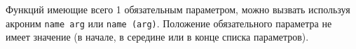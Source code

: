 \begin{sourcecode}
	\label{defaultparametrs}
	\inputminted[linenos]{icl}{../sources/defaultparametrs.icL}
\end{sourcecode}

Функций имеющие всего 1 обязательным параметром, можно вызвать используя акроним \texttt{name arg} или \texttt{name (arg)}. Положение обязательного параметра не имеет значение (в начале, в середине или в конце списка параметров).
